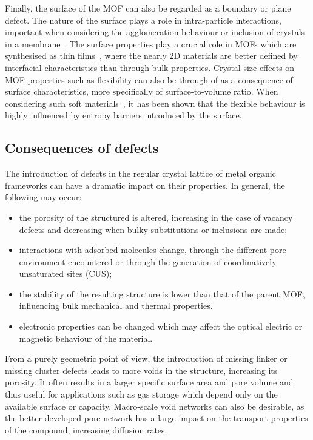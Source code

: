 Finally, the surface of the MOF can also be regarded as a
boundary or plane defect. The nature of the surface plays a role
in intra-particle interactions, important when considering
the agglomeration behaviour or inclusion of crystals in
a membrane~\cite{seminoMicroscopicModelMetal2016}.
The surface properties play a crucial role in MOFs which 
are synthesised as thin 
films~\cite{gliemannEpitaxiallyGrownMetalorganic2012, %
	stassenUpdatedRoadmapIntegration2017}, where the nearly
2D materials are better defined by interfacial characteristics
than through bulk properties.
Crystal size effects on MOF properties such as flexibility
can also be through of as a consequence of surface characteristics, 
more specifically of surface-to-volume ratio. When considering 
such soft materials~\cite{krauseEffectCrystalliteSize2018, %
	vanduyfhuysThermodynamicInsightStimuliresponsive2018}, it has
been shown that the flexible behaviour is highly influenced
by entropy barriers introduced by the surface.

\subsection{Consequences of defects}

The introduction of defects in the regular crystal lattice of metal
organic frameworks can have a dramatic impact on their properties.
In general, the following may occur:

\begin{itemize}
	\item the porosity of the structured is altered, increasing
	      in the case of vacancy defects and decreasing when bulky
	      substitutions or inclusions are made;
	\item interactions with adsorbed molecules change,
	      through the different pore environment encountered or
	      through the generation of coordinatively unsaturated
	      sites (CUS);
	\item the stability of the resulting structure is lower
	      than that of the parent MOF, influencing bulk mechanical
	      and thermal properties.
	\item electronic properties can be changed which may
	      affect the optical electric or magnetic behaviour of the
	      material.
\end{itemize}

From a purely geometric point of view, the introduction of missing
linker or missing cluster defects leads to more voids in the structure,
increasing its porosity. It often results in a larger
specific surface area and pore volume and thus useful for applications
such as gas storage which depend only on the available surface or
capacity. Macro-scale void networks can also be desirable, as the 
better developed pore network has a large impact on the transport
properties of the compound, increasing diffusion rates. 

